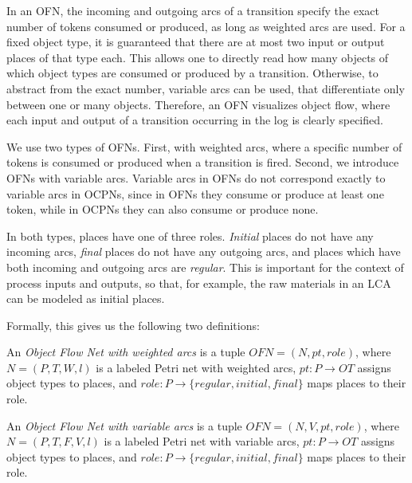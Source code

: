 In an OFN, the incoming and outgoing arcs of a transition specify the exact number of tokens consumed or produced, as long as weighted arcs are used.
For a fixed object type, it is guaranteed that there are at most two input or output places of that type each.
This allows one to directly read how many objects of which object types are consumed or produced by a transition.
Otherwise, to abstract from the exact number, variable arcs can be used, that differentiate only between one or many objects.
Therefore, an OFN visualizes object flow, where each input and output of a transition occurring in the log is clearly specified.



We use two types of OFNs.
First, with weighted arcs, where a specific number of tokens is consumed or produced when a transition is fired.
Second, we introduce OFNs with variable arcs.
Variable arcs in OFNs do not correspond exactly to variable arcs in OCPNs, since in OFNs they consume or produce at least one token, while in OCPNs they can also consume or produce none.



In both types, places have one of three roles.
\emph{Initial} places do not have any incoming arcs, \emph{final} places do not have any outgoing arcs, and places which have both incoming and outgoing arcs are \emph{regular}.
This is important for the context of process inputs and outputs, so that, for example, the raw materials in an LCA can be modeled as initial places.



Formally, this gives us the following two definitions:

\begin{definition}
    An \emph{Object Flow Net with weighted arcs} is a tuple $OFN = (N, pt, role)$, where $N = (P, T, W, l)$ is a labeled Petri net with weighted arcs, $pt: P \to OT$ assigns object types to places, and $role: P \to \{regular, initial, final\}$ maps places to their role.
\end{definition}

\begin{definition}
    An \emph{Object Flow Net with variable arcs} is a tuple $OFN = (N, V, pt, role)$, where $N = (P, T, F, V, l)$ is a labeled Petri net with variable arcs, $pt: P \to OT$ assigns object types to places, and $role: P \to \{regular, initial, final\}$ maps places to their role.
\end{definition}



